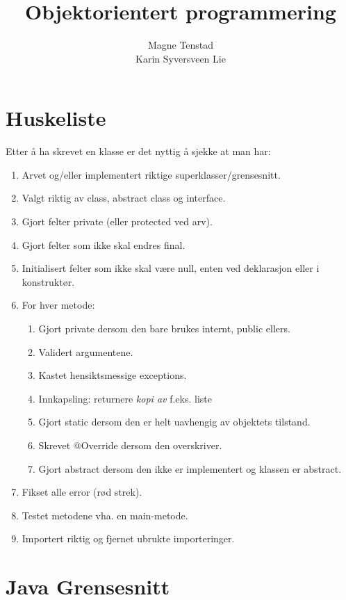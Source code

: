 \documentclass{article}
\title{Objektorientert programmering}
\author{Magne Tenstad \\ Karin Syversveen Lie}
\begin{document}
\maketitle

\clearpage

\tableofcontents

\clearpage


\section{Huskeliste}
Etter å ha skrevet en klasse er det nyttig å sjekke at man har:
\begin{enumerate}
    \item Arvet og/eller implementert riktige superklasser/grensesnitt.
    \item Valgt riktig av class, abstract class og interface.
    \item Gjort felter private (eller protected ved arv).
    \item Gjort felter som ikke skal endres final.
    \item Initialisert felter som ikke skal være null, enten ved deklarasjon eller i konstruktør.
    \item For hver metode:
    \begin{enumerate}
        \item Gjort private dersom den bare brukes internt, public ellers.
        \item Validert argumentene.
        \item Kastet hensiktsmessige exceptions.
        \item Innkapsling: returnere \textit{kopi av} f.eks. liste
        \item Gjort static dersom den er helt uavhengig av objektets tilstand.
        \item Skrevet @Override dersom den overskriver.
        \item Gjort abstract dersom den ikke er implementert og klassen er abstract.
    \end{enumerate}
    \item Fikset alle error (rød strek).
    \item Testet metodene vha. en main-metode.
    \item Importert riktig og fjernet ubrukte importeringer.
\end{enumerate}

\section{Java Grensesnitt}
\end{document}
